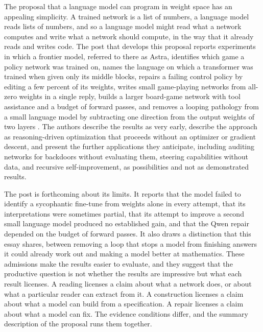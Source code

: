 \documentclass[11pt]{article}
\begin{document}
The proposal that a language model can program in weight space has an appealing simplicity. A trained network is a list of numbers, a language model reads lists of numbers, and so a language model might read what a network computes and write what a network should compute, in the way that it already reads and writes code. The post that develops this proposal reports experiments in which a frontier model, referred to there as Astra, identifies which game a policy network was trained on, names the language on which a transformer was trained when given only its middle blocks, repairs a failing control policy by editing a few percent of its weights, writes small game-playing networks from all-zero weights in a single reply, builds a larger board-game network with tool assistance and a budget of forward passes, and removes a looping pathology from a small language model by subtracting one direction from the output weights of two layers \cite{takehi2026}. The authors describe the results as very early, describe the approach as reasoning-driven optimization that proceeds without an optimizer or gradient descent, and present the further applications they anticipate, including auditing networks for backdoors without evaluating them, steering capabilities without data, and recursive self-improvement, as possibilities and not as demonstrated results.

The post is forthcoming about its limits. It reports that the model failed to identify a sycophantic fine-tune from weights alone in every attempt, that its interpretations were sometimes partial, that its attempt to improve a second small language model produced no established gain, and that the Qwen repair depended on the budget of forward passes. It also draws a distinction that this essay shares, between removing a loop that stops a model from finishing answers it could already work out and making a model better at mathematics. These admissions make the results easier to evaluate, and they suggest that the productive question is not whether the results are impressive but what each result licenses. A reading licenses a claim about what a network does, or about what a particular reader can extract from it. A construction licenses a claim about what a model can build from a specification. A repair licenses a claim about what a model can fix. The evidence conditions differ, and the summary description of the proposal runs them together.
\end{document}
